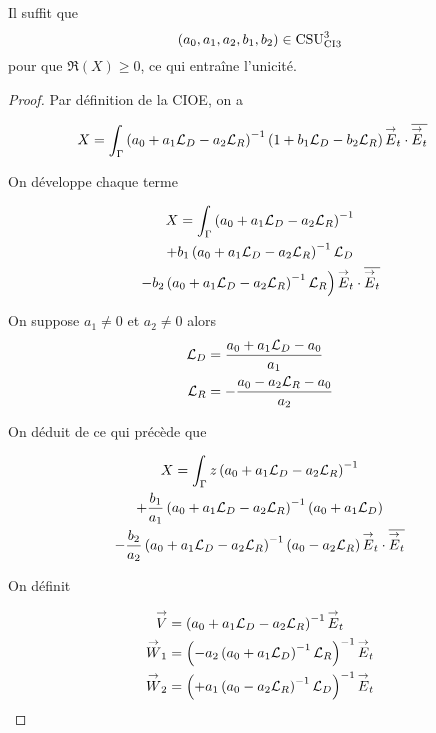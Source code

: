   
  \begin{prop}
    \label{prop:csu:ci3-3}
    Il suffit que
    \begin{equation*}
      (a_0,a_1,a_2,b_1,b_2) \in \CSU[3]{CI3}
    \end{equation*}
    pour que \(\Re(X)\ge 0\), ce qui entraîne l'unicité.
  \end{prop}

  \begin{proof}
    Par définition de la CIOE, on a

    \begin{align*}
      X &= \int_\Gamma \left(a_0 + a_1 \LD - a_2 \LR \right)^{-1}\left( 1 + b_1 \LD - b_2 \LR \right) \vE_t\cdot \conj{\vE_t}
    \end{align*}

    On développe chaque terme

    \begin{multline*}
      X = \int_\Gamma \left(a_0 + a_1 \LD - a_2 \LR \right)^{-1}
      \\
      + b_1 \left(a_0 + a_1 \LD - a_2 \LR \right)^{-1}\LD
      \\
      \left.
      - b_2 \left(a_0 + a_1 \LD - a_2 \LR \right)^{-1}\LR \right) \vE_t\cdot \conj{\vE_t}
    \end{multline*}

    On suppose \(a_1\not=0\) et \(a_2\not=0\) alors
    \begin{align*}
      \LD & = \frac{a_0 + a_1 \LD - a_0}{a_1}
      \\
      \LR & = -\frac{a_0 - a_2 \LR - a_0}{a_2}
    \end{align*}


    On déduit de ce qui précède que

    \begin{multline*}
      X = \int_\Gamma z\left(a_0 + a_1 \LD - a_2 \LR \right)^{-1}
      \\
      + \frac{b_1}{a_1} \left(a_0 + a_1 \LD - a_2 \LR \right)^{-1}\left(a_0+a_1\LD\right)
      \\
      - \frac{b_2}{a_2} \left(a_0 + a_1 \LD - a_2 \LR \right)^{-1}\left(a_0-a_2\LR\right) \vE_t\cdot \conj{\vE_t}
    \end{multline*}

    On définit

    \newcommand{\vV}{\vect{V}}
    \newcommand{\vW}{\vect{W}}

    \begin{align*}
      \vV & = \left(a_0  + a_1 \LD - a_2\LR \right)^{-1} \vE_t
      \\
      \vW_1 & = \left( - a_2 \left( a_0 + a_1\LD\right)^{-1}\LR\right)^{-1} \vE_t
      \\
      \vW_2 & = \left( + a_1 \left( a_0 - a_2\LR\right)^{-1}\LD\right)^{-1} \vE_t
    \end{align*}


\end{proof}
